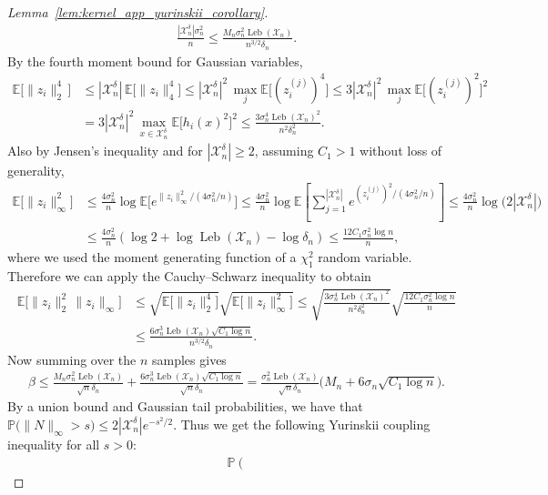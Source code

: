 \documentclass[11pt,lof]{puthesis}
\renewcommand{\P}{\ensuremath{\mathbb{P}}}
\newcommand{\E}{\ensuremath{\mathbb{E}}}
\newcommand{\cX}{\ensuremath{\mathcal{X}}}
\DeclareMathOperator{\Leb}{Leb}
\theoremstyle{break}
\theoremstyle{proof}
\newtheorem{proof}{Proof}
\begin{document}
\begin{proof}[Lemma~\ref{lem:kernel_app_yurinskii_corollary}]
\begin{align*}
\frac{|\cX_n^\delta| \sigma_n^2}{n}
\leq
\frac{M_n \sigma_n^2 \Leb(\cX_n)}{n^{3/2}\delta_n}.
\end{align*}
%
By the fourth moment bound for Gaussian variables,
%
\begin{align*}
\E\big[
\|z_i\|_2^4 \,
\big]
&\leq
|\cX_n^\delta| \,
\E\big[
\|z_i\|_4^4
\big]
\leq
|\cX_n^\delta|^2 \,
\max_j
\E\big[
(z_i^{(j)})^4
\big]
\leq
3
|\cX_n^\delta|^2 \,
\max_j
\E\big[
(z_i^{(j)})^2
\big]^2 \\
&=
3
|\cX_n^\delta|^2 \,
\max_{x \in \cX_n^\delta}
\E\big[
h_i(x)^2
\big]^2
\leq
\frac{3\sigma_n^4 \Leb(\cX_n)^2}{n^2\delta_n^2} .
\end{align*}
%
Also by Jensen's inequality
and for $|\cX_n^\delta| \geq 2$,
assuming $C_1 > 1$ without loss of generality,
%
\begin{align*}
\E\big[
\|z_i\|_\infty^2
\big]
&\leq
\frac{4 \sigma_n^2}{n}
\log
\E\big[
e^{\|z_i\|_\infty^2 / (4\sigma_n^2/n)}
\big]
\leq
\frac{4 \sigma_n^2}{n}
\log
\E\left[
\sum_{j=1}^{|\cX_n^\delta|}
e^{(z_i^{(j)})^2 / (4\sigma_n^2/n)}
\right]
\leq
\frac{4\sigma_n^2}{n}
\log \big(2|\cX_n^\delta|\big) \\
&\leq
\frac{4\sigma_n^2}{n}
\left(
\log 2 + \log \Leb(\cX_n) - \log \delta_n
\right)
\leq
\frac{12 C_1 \sigma_n^2 \log n}{n},
\end{align*}
%
where we used the moment
generating function of a $\chi_1^2$ random variable.
Therefore we can apply the Cauchy--Schwarz inequality
to obtain
%
\begin{align*}
\E\big[\|z_i\|_2^2 \,
\|z_i\|_\infty
\big]
&\leq
\sqrt{
\E\big[\|z_i\|_2^4
\big]}
\sqrt{
\E\big[
\|z_i\|_\infty^2
\big]}
\leq
\sqrt{
\frac{3\sigma_n^4 \Leb(\cX_n)^2}{n^2\delta_n^2}}
\sqrt{ \frac{12 C_1 \sigma_n^2 \log n}{n} } \\
&\leq
\frac{6\sigma_n^3
\Leb(\cX_n)
\sqrt{C_1 \log n}}{n^{3/2} \delta_n}.
\end{align*}
%
Now summing over the $n$ samples gives
%
\begin{align*}
\beta
\leq
\frac{M_n \sigma_n^2 \Leb(\cX_n)}{\sqrt n \delta_n}
+ \frac{6\sigma_n^3 \Leb(\cX_n) \sqrt{C_1 \log n}}
{\sqrt n \delta_n}
=
\frac{\sigma_n^2 \Leb(\cX_n)}{\sqrt n \delta_n}
\Big(M_n + 6\sigma_n \sqrt{C_1 \log n}\Big).
\end{align*}
%
By a union bound
and Gaussian tail probabilities,
we have that
$\P\big( \|N\|_\infty > s)
\leq 2|\cX_n^\delta| e^{-s^2/2}$.
Thus we get the following Yurinskii coupling inequality
for all $s > 0$:
%
\begin{align*}
\P\left(

\end{align*}
\end{proof}
\end{document}
